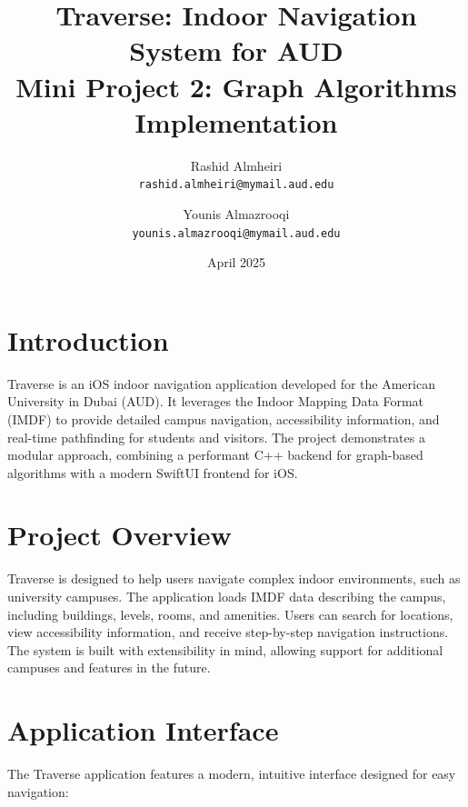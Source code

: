 \documentclass{article}
\title{Traverse: Indoor Navigation System for AUD\\
\large Mini Project 2: Graph Algorithms Implementation}
\author{Rashid Almheiri \\ \texttt{rashid.almheiri@mymail.aud.edu} \\ \and Younis Almazrooqi \\ \texttt{younis.almazrooqi@mymail.aud.edu}}
\date{April 2025}
\begin{document}
\maketitle

\section{Introduction}
Traverse is an iOS indoor navigation application developed for the American University in Dubai (AUD). It leverages the Indoor Mapping Data Format (IMDF) to provide detailed campus navigation, accessibility information, and real-time pathfinding for students and visitors. The project demonstrates a modular approach, combining a performant C++ backend for graph-based algorithms with a modern SwiftUI frontend for iOS.

\section{Project Overview}
Traverse is designed to help users navigate complex indoor environments, such as university campuses. The application loads IMDF data describing the campus, including buildings, levels, rooms, and amenities. Users can search for locations, view accessibility information, and receive step-by-step navigation instructions. The system is built with extensibility in mind, allowing support for additional campuses and features in the future.

\section{Application Interface}
The Traverse application features a modern, intuitive interface designed for easy navigation:
\end{document}
